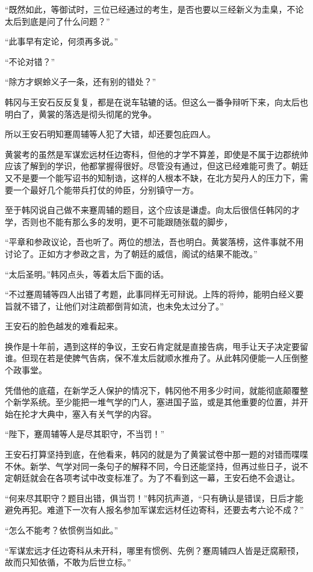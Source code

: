 “既然如此，等御试时，三位已经通过的考生，是否也要以三经新义为圭臬，不论太后到底是问了什么问题？”

“此事早有定论，何须再多说。”

“不论对错？”

“除方才螟蛉义子一条，还有别的错处？”

韩冈与王安石反反复复，都是在说车轱辘的话。但这么一番争辩听下来，向太后也明白了，黄裳的落选是彻头彻尾的党争。

所以王安石明知蹇周辅等人犯了大错，却还要包庇四人。

黄裳考的虽然是军谋宏远材任边寄科，但他的才学不算差，即使是不属于边郡统帅应该了解到的学识，他都掌握得很好。尽管没有通过，但这已经难能可贵了。朝廷又不是要一个能写诏书的知制诰，这样的人根本不缺，在北方契丹人的压力下，需要一个最好几个能带兵打仗的帅臣，分别镇守一方。

至于韩冈说自己做不来蹇周辅的题目，这个应该是谦虚。向太后很信任韩冈的才学，否则也不能有那么多的发明，更不可能跟随张载的脚步，

“平章和参政议论，吾也听了。两位的想法，吾也明白。黄裳落榜，这件事就不用讨论了。正如方才参政之言，为了朝廷的威信，阁试的结果不能改。”

“太后圣明。”韩冈点头，等着太后下面的话。

“不过蹇周辅等四人出错了考题，此事同样无可辩说。上阵的将帅，能明白经义要旨就不错了，让他们对注疏都倒背如流，也未免太过分了。”

王安石的脸色越发的难看起来。

换作是十年前，遇到这样的争议，王安石肯定就是直接告病，甩手让天子决定要留谁。但现在若是使脾气告病，保不准太后就顺水推舟了。从此韩冈便能一人压倒整个政事堂。

凭借他的底蕴，在新学乏人保护的情况下，韩冈他不用多少时间，就能彻底颠覆整个新学系统。至少能把一堆气学的门人，塞进国子监，或是其他重要的位置，并开始在抡才大典中，塞入有关气学的内容。

“陛下，蹇周辅等人是尽其职守，不当罚！”

王安石打算坚持到底，在他看来，韩冈的就是为了黄裳试卷中那一题的对错而喋喋不休。新学、气学对同一条句子的解释不同，今日还能坚持，但再过些日子，说不定朝廷就会在各项考试中改变标准了。为了不看到这一幕，王安石绝不会退让。

“何来尽其职守？题目出错，俱当罚！”韩冈抗声道，“只有确认是错误，日后才能避免再犯。难道下一次有人报名参加军谋宏远材任边寄科，还要去考六论不成？”

“怎么不能考？依惯例当如此。”

“军谋宏远才任边寄科从未开科，哪里有惯例、先例？蹇周辅四人皆是迂腐颟顸，故而只知依循，不敢为后世立标。”

